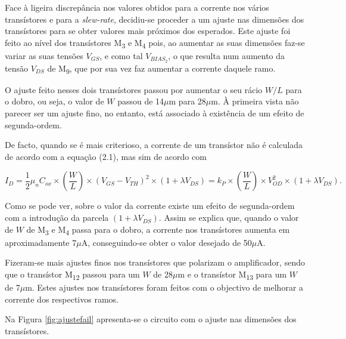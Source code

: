 \documentclass[11pt]{article}
\numberwithin{equation}{section}
\begin{document}
Face à ligeira discrepância nos valores obtidos para a corrente nos vários transístores e para a \textit{slew-rate}, decidiu-se proceder a um ajuste nas dimensões dos transístores para se obter valores mais próximos dos esperados. Este ajuste foi feito ao nível dos transístores M\textsubscript{3} e M\textsubscript{4} pois, ao aumentar as suas dimensões faz-se variar as suas tensões $V_{GS}$, e como tal $V_{BIAS_{2}}$, o que resulta num aumento da tensão $V_{DS}$ de M\textsubscript{9}, que por sua vez faz aumentar a corrente daquele ramo.

O ajuste feito nesses dois transístores passou por aumentar o seu rácio $W/L$ para o dobro, ou seja, o valor de $W$ passou de 14$\mu$m para 28$\mu$m. À primeira vista não parecer ser um ajuste fino, no entanto, está associado à existência de um efeito de segunda-ordem.

De facto, quando se é mais criterioso, a corrente de um transístor não é calculada de acordo com a equação (2.1), mas sim de acordo com

\vspace{-3mm}
\begin{equation}
I_{D} = \frac{1}{2}\mu_{n}C_{ox}\times \left(\frac{W}{L}\right) \times \left(V_{GS}-V_{TH}\right)^2 \times \left(1+\lambda V_{DS}\right) = k_P \times \left(\frac{W}{L}\right) \times V_{OD}^2 \times \left(1+\lambda V_{DS}\right).
\end{equation}

\vspace{1mm}
Como se pode ver, sobre o valor da corrente existe um efeito de segunda-ordem com a introdução da parcela $\left(1+\lambda V_{DS}\right)$. Assim se explica que, quando o valor de $W$ de M\textsubscript{3} e M\textsubscript{4} passa para o dobro, a corrente nos transístores aumenta em aproximadamente 7$\mu$A, conseguindo-se obter o valor desejado de 50$\mu$A.

Fizeram-se mais ajustes finos nos transístores que polarizam o amplificador, sendo que o transístor M\textsubscript{12} passou para um $W$ de 28$\mu$m e o transístor M\textsubscript{13} para um $W$ de 7$\mu$m. Estes ajustes nos transístores foram feitos com o objectivo de melhorar a corrente dos respectivos ramos.

Na Figura \ref{fig:ajustefail} apresenta-se o circuito com o ajuste nas dimensões dos transístores.
\end{document}
